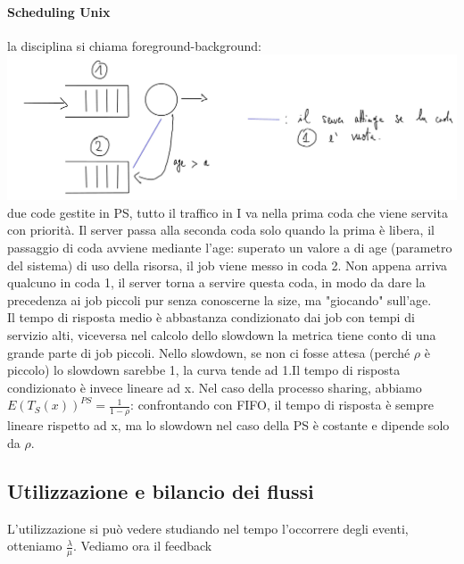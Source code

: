\documentclass{article}
\begin{document}
\paragraph{Scheduling Unix}la disciplina si chiama foreground-background:\\
\includegraphics[scale=0.3]{images/PMCSN-1603-1.3.jpeg}\\
due code gestite in PS, tutto il traffico in I va nella prima coda che viene servita con priorità. Il server passa alla seconda coda solo quando la prima è libera, il passaggio di coda avviene mediante l'age: superato un valore a di age (parametro del sistema) di uso della risorsa, il job viene messo in coda 2. Non appena arriva qualcuno in coda 1, il server torna a servire questa coda, in modo da dare la precedenza ai job piccoli pur senza conoscerne la size, ma "giocando" sull'age.\\
Il tempo di risposta medio è abbastanza condizionato dai job con tempi di servizio alti, viceversa nel calcolo dello slowdown la metrica tiene conto di una grande parte di job piccoli. Nello slowdown, se non ci fosse attesa (perché $\rho$ è piccolo) lo slowdown sarebbe 1, la curva tende ad 1.Il tempo di risposta condizionato è invece lineare ad x. Nel caso della processo sharing, abbiamo $E(T_S(x))^{PS} = \frac{1}{1 - \rho}$: confrontando con FIFO, il tempo di risposta è sempre lineare rispetto ad x, ma lo slowdown nel caso della PS è costante e dipende solo da $\rho$.
\subsection{Utilizzazione e bilancio dei flussi}
L'utilizzazione si può vedere studiando nel tempo l'occorrere degli eventi, otteniamo $\frac{\lambda}{\mu}$. Vediamo ora il feedback
\end{document}
